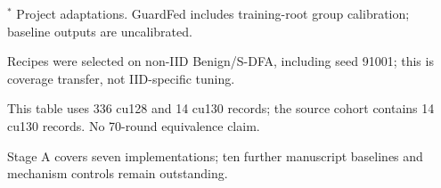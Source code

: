\begin{table}[t]
\begin{minipage}{\textwidth}
$^{*}$ Project adaptations. GuardFed includes training-root group calibration; baseline outputs are uncalibrated.\par
Recipes were selected on non-IID Benign/S-DFA, including seed 91001; this is coverage transfer, not IID-specific tuning.\par
This table uses 336 cu128 and 14 cu130 records; the source cohort contains 14 cu130 records. No 70-round equivalence claim.\par
Stage A covers seven implementations; ten further manuscript baselines and mechanism controls remain outstanding.\par
\end{minipage}
\end{table}
